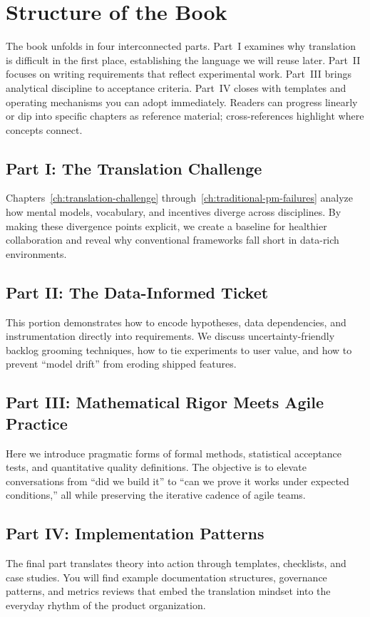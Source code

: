 \section{Structure of the Book}
\label{sec:structure}

The book unfolds in four interconnected parts. Part~I examines why translation is difficult in the first place, establishing the language we will reuse later. Part~II focuses on writing requirements that reflect experimental work. Part~III brings analytical discipline to acceptance criteria. Part~IV closes with templates and operating mechanisms you can adopt immediately. Readers can progress linearly or dip into specific chapters as reference material; cross-references highlight where concepts connect.

\subsection{Part I: The Translation Challenge}
Chapters~\ref{ch:translation-challenge} through~\ref{ch:traditional-pm-failures} analyze how mental models, vocabulary, and incentives diverge across disciplines. By making these divergence points explicit, we create a baseline for healthier collaboration and reveal why conventional frameworks fall short in data-rich environments.

\subsection{Part II: The Data-Informed Ticket}
This portion demonstrates how to encode hypotheses, data dependencies, and instrumentation directly into requirements. We discuss uncertainty-friendly backlog grooming techniques, how to tie experiments to user value, and how to prevent ``model drift'' from eroding shipped features.

\subsection{Part III: Mathematical Rigor Meets Agile Practice}
Here we introduce pragmatic forms of formal methods, statistical acceptance tests, and quantitative quality definitions. The objective is to elevate conversations from ``did we build it'' to ``can we prove it works under expected conditions,'' all while preserving the iterative cadence of agile teams.

\subsection{Part IV: Implementation Patterns}
The final part translates theory into action through templates, checklists, and case studies. You will find example documentation structures, governance patterns, and metrics reviews that embed the translation mindset into the everyday rhythm of the product organization.

